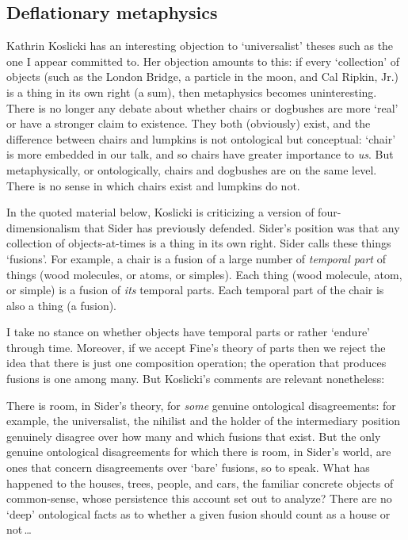 \documentclass[11pt]{article}
\newenvironment{squote}{%
\begin{spacing}{1}
\begin{list}{}{%
\setlength{\labelwidth}{0pt}%
\rightmargin\leftmargin%
}
\item\relax
}{%
\end{list}%
\end{spacing}
}
\begin{document}
\begin{spacing}{1.5}
\subsection{Deflationary metaphysics}
\label{deflate}
Kathrin Koslicki has an interesting objection to `universalist' theses
such as the one I appear committed to.  Her objection amounts to this:
if every `collection' of objects (such as the London Bridge, a
particle in the moon, and Cal Ripkin, Jr.) is a thing in its own right
(a sum), then metaphysics becomes uninteresting.  There is no longer
any debate about whether chairs or dogbushes are more `real' or have a
stronger claim to existence.  They both (obviously) exist, and the
difference between chairs and lumpkins is not ontological but
conceptual: `chair' is more embedded in our talk, and so chairs have
greater importance to {\em us}.  But metaphysically, or ontologically,
chairs and dogbushes are on the same level.  There is no sense in
which chairs exist and lumpkins do not.

In the quoted material below, Koslicki is criticizing a version of
four-dimensionalism that Sider has previously defended.  Sider's
position was that any collection of objects-at-times is a thing in its
own right.  Sider calls these things `fusions'.  For example, a chair
is a fusion of a large number of {\em temporal part} of things (wood
molecules, or atoms, or simples).  Each thing (wood molecule, atom, or
simple) is a fusion of {\em its} temporal parts.  Each temporal part
of the chair is also a thing (a fusion).

I take no stance on whether objects have temporal parts or rather
`endure' through time.  Moreover, if we accept Fine's theory of parts
then we reject the idea that there is just one composition operation;
the operation that produces fusions is one among many.  But Koslicki's
comments are relevant nonetheless:

\begin{squote}
There is room, in Sider's theory, for {\em some} genuine ontological
disagreements: for example, the universalist, the nihilist and the
holder of the intermediary position genuinely disagree over how many
and which fusions that exist.  But the only genuine ontological
disagreements for which there is room, in Sider's world, are ones that
concern disagreements over `bare' fusions, so to speak.  What has
happened to the houses, trees, people, and cars, the familiar concrete
objects of common-sense, whose persistence this account set out to
analyze?  There are no `deep' ontological facts as to whether a given
fusion should count as a house or not\,\ldots


\end{squote}
\end{spacing}
\end{document}

